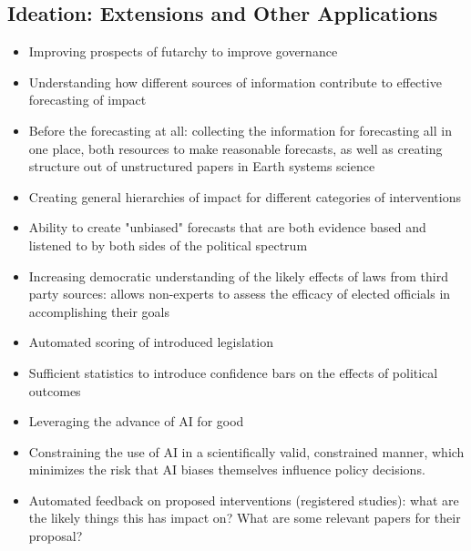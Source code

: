 \documentclass[12pt,a4paper]{article}
\begin{document}
\subsection{Ideation: Extensions and Other Applications}
\begin{itemize}
    \item Improving prospects of futarchy to improve governance
    \item Understanding how different sources of information contribute to effective forecasting of impact
    \item Before the forecasting at all: collecting the information for forecasting all in one place, both resources to make reasonable forecasts, as well as creating structure out of unstructured papers in Earth systems science
    \item Creating general hierarchies of impact for different categories of interventions
    \item Ability to create "unbiased" forecasts that are both evidence based and listened to by both sides of the political spectrum
    \item Increasing democratic understanding of the likely effects of laws from third party sources: allows non-experts to assess the efficacy of elected officials in accomplishing their goals
    \item Automated scoring of introduced legislation 
    \item Sufficient statistics to introduce confidence bars on the effects of political outcomes
    \item Leveraging the advance of AI for good
    \item Constraining the use of AI in a scientifically valid, constrained manner, which minimizes the risk that AI biases themselves influence policy decisions.  
    \item Automated feedback on proposed interventions (registered studies): what are the likely things this has impact on? What are some relevant papers for their proposal?
\end{itemize}
\end{document}
